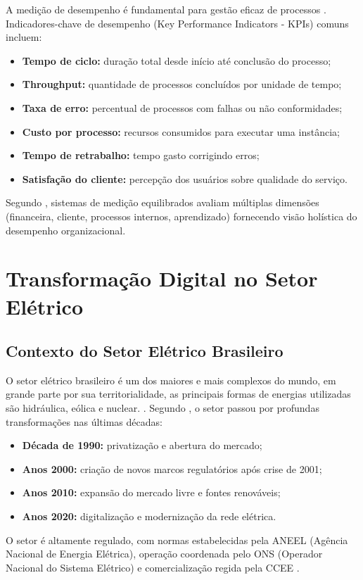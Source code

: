 A medição de desempenho é fundamental para gestão eficaz de processos \cite{neely2005}. Indicadores-chave de desempenho (Key Performance Indicators - KPIs) comuns incluem:

\begin{itemize}
    \item \textbf{Tempo de ciclo:} duração total desde início até conclusão do processo;
    \item \textbf{Throughput:} quantidade de processos concluídos por unidade de tempo;
    \item \textbf{Taxa de erro:} percentual de processos com falhas ou não conformidades;
    \item \textbf{Custo por processo:} recursos consumidos para executar uma instância;
    \item \textbf{Tempo de retrabalho:} tempo gasto corrigindo erros;
    \item \textbf{Satisfação do cliente:} percepção dos usuários sobre qualidade do serviço.
\end{itemize}

Segundo \cite{kaplan1996}, sistemas de medição equilibrados avaliam múltiplas dimensões (financeira, cliente, processos internos, aprendizado) fornecendo visão holística do desempenho organizacional.

\section{Transformação Digital no Setor Elétrico}

\subsection{Contexto do Setor Elétrico Brasileiro}

O setor elétrico brasileiro é um dos maiores e mais complexos do mundo, em grande parte por sua territorialidade, as principais formas de energias utilizadas são hidráulica, eólica e nuclear. \cite{aneel2022}. Segundo \cite{tolmasquim2016}, o setor passou por profundas transformações nas últimas décadas:
\begin{itemize}
    \item \textbf{Década de 1990:} privatização e abertura do mercado;
    \item \textbf{Anos 2000:} criação de novos marcos regulatórios após crise de 2001;
    \item \textbf{Anos 2010:} expansão do mercado livre e fontes renováveis;
    \item \textbf{Anos 2020:} digitalização e modernização da rede elétrica.
\end{itemize}
O setor é altamente regulado, com normas estabelecidas pela ANEEL (Agência Nacional de Energia Elétrica), operação coordenada pelo ONS (Operador Nacional do Sistema Elétrico) e comercialização regida pela CCEE \cite{ccee2023}.
